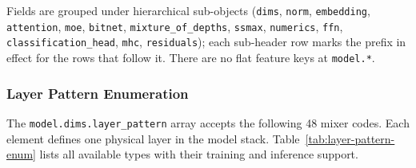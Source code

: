 Fields are grouped under hierarchical sub-objects (\texttt{dims}, \texttt{norm}, \texttt{embedding}, \texttt{attention}, \texttt{moe}, \texttt{bitnet}, \texttt{mixture\_of\_depths}, \texttt{ssmax}, \texttt{numerics}, \texttt{ffn}, \texttt{classification\_head}, \texttt{mhc}, \texttt{residuals}); each sub-header row marks the prefix in effect for the rows that follow it. There are no flat feature keys at \texttt{model.*}.

\subsubsection{Layer Pattern Enumeration}
\label{tab:layer-pattern}

The \texttt{model.dims.layer\_pattern} array accepts the following 48 mixer codes. Each element defines one physical layer in the model stack. Table~\ref{tab:layer-pattern-enum} lists all available types with their training and inference support.

